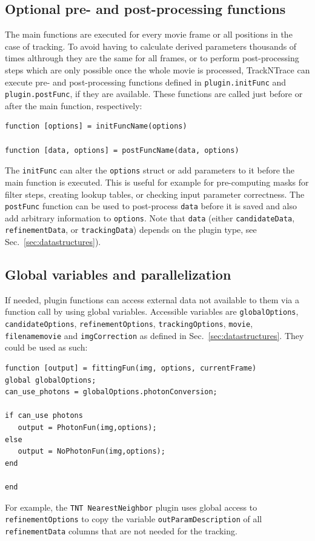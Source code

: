 \documentclass[11pt,onside]{report}
\numberwithin{equation}{chapter}
\begin{document}
\subsection{Optional pre- and post-processing functions}
The main functions are executed for every movie frame or all positions in the case of tracking. To avoid having to calculate derived parameters thousands of times althrough they are the same for all frames, or to perform post-processing steps which are only possible once the whole movie is processed, TrackNTrace can execute pre- and post-processing functions defined in \texttt{plugin.initFunc} and \texttt{plugin.postFunc}, if they are available. These functions are called just before or after the main function, respectively:
\begin{lstlisting}[style=Matlab-editor]
function [options] = initFuncName(options)

function [data, options] = postFuncName(data, options)
\end{lstlisting}
The \texttt{initFunc} can alter the \texttt{options} struct or add parameters to it before the main function is executed. This is useful for example for pre-computing masks for filter steps, creating lookup tables, or checking input parameter correctness. The \texttt{postFunc} function can be used to post-process \texttt{data} before it is saved and also add arbitrary information to \texttt{options}. Note that \texttt{data} (either \texttt{candidateData}, \texttt{refinementData}, or \texttt{trackingData}) depends on the plugin type, see Sec.~\ref{sec:datastructures}). 

\subsection{Global variables and parallelization}
If needed, plugin functions can access external data not available to them via a function call by using global variables. Accessible variables are \texttt{globalOptions}, \texttt{candidateOptions}, \texttt{refinementOptions}, \texttt{trackingOptions}, \texttt{movie}, \texttt{filename\textunderscore movie} and \texttt{imgCorrection} as defined in Sec.~\ref{sec:datastructures}. They could be used as such:
\begin{lstlisting}[style=Matlab-editor]
function [output] = fittingFun(img, options, currentFrame)
global globalOptions;
can_use_photons = globalOptions.photonConversion;

if can_use photons
   output = PhotonFun(img,options);
else
   output = NoPhotonFun(img,options);
end

end
\end{lstlisting}
For example, the \texttt{TNT NearestNeighbor} plugin uses global access to \texttt{refinementOptions} to copy the variable \texttt{outParamDescription} of all \texttt{refinementData} columns that are not needed for the tracking. 
\end{document}
